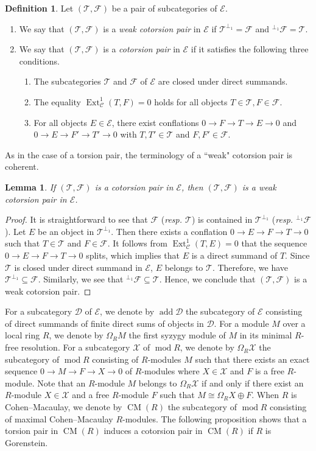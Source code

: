 \documentclass{amsart}
\newtheorem{lem}[thm]{Lemma}
\theoremstyle{definition}
\newtheorem{dfn}[thm]{Definition}
\theoremstyle{remark}
\def\add{\operatorname{add}}
\def\C{\mathcal{C}}
\def\CM{\operatorname{CM}}
\def\D{\mathcal{D}}
\def\E{\mathcal{E}}
\def\Ext{\operatorname{Ext}}
\def\F{\mathcal{F}}
\def\mod{\operatorname{mod}}
\def\T{\mathcal{T}}
\def\X{\mathcal{X}}
\begin{document}
\begin{dfn}\label{dfn cotorsion pair}
Let $(\T,\F)$ be a pair of subcategories of $\E$.
\begin{enumerate}[\rm(1)]
\item 
We say that $(\T,\F)$ is a {\em weak cotorsion pair} in $\E$ if $\T^{\perp_1}=\F$ and $^{\perp_1}\F=\T$.
\item 
We say that $(\T,\F)$ is a {\em cotorsion pair} in $\E$ if it satisfies the following three conditions.
\begin{enumerate}[\rm(a)]
\item 
The subcategories $\T$ and $\F$ of $\E$ are closed under direct summands.
\item 
The equality $\Ext^1_\C(T,F)=0$ holds for all objects $T\in\T,F\in\F$.
\item 
For all objects $E\in\E$, there exist conflations $0\to F\to T\to E\to0$ and $0\to E\to F'\to T'\to0$ with $T,T'\in\T$ and $F,F'\in\F$.
\end{enumerate}
\end{enumerate}
\end{dfn}

As in the case of a torsion pair, the terminology of a ``weak" cotorsion pair is coherent.

\begin{lem}
If $(\T,\F)$ is a cotorsion pair in $\E$, then $(\T,\F)$ is a weak cotorsion pair in $\E$.
\end{lem}

\begin{proof}
It is straightforward to see that $\F$ (\emph{resp. $\T$}) is contained in $\T^{\perp_1}$ (\emph{resp. ${}^{\perp_1}\F$}). Let $E$ be an object in $\T^{\perp_1}$. Then there exists a conflation $0\to E\to F\to T\to0$ such that $T\in \T$ and $F\in \F$. It follows from $\Ext^1_\C(T,E)=0$ that the sequence $0\to E\to F\to T\to0$ splits, which implies that $E$ is a direct summand of $T$. Since $\T$ is closed under direct summand in $\E$, $E$ belongs to $\T$. Therefore, we have $\T^{\perp_1}\subseteq\F$. Similarly, we see that $^{\perp_1}\F\subseteq\T$. Hence, we conclude that $(\T,\F)$ is a weak cotorsion pair.
\end{proof}

For a subcategory $\D$ of $\E$, we denote by $\add\D$ the subcategory of $\E$ consisting of direct summands of finite direct sums of objects in $\D$. For a module $M$ over a local ring $R$, we denote by $\Omega_RM$ the first syzygy module of $M$ in its minimal $R$-free resolution. For a subcategory $\X$ of $\mod R$, we denote by $\Omega_R\X$ the subcategory of $\mod R$ consisting of $R$-modules $M$ such that there exists an exact sequence $0\to M\to F\to X\to0$ of $R$-modules where $X\in\X$ and $F$ is a free $R$-module. Note that an $R$-module $M$ belongs to $\Omega_R\X$ if and only if there exist an $R$-module $X\in\X$ and a free $R$-module $F$ such that $M\cong\Omega_RX\oplus F$. When $R$ is Cohen--Macaulay, we denote by $\CM(R)$ the subcategory of $\mod R$ consisting of maximal Cohen--Macaulay $R$-modules. The following proposition shows that a torsion pair in $\CM(R)$ induces a cotorsion pair in $\CM(R)$ if $R$ is Gorenstein.
\end{document}
